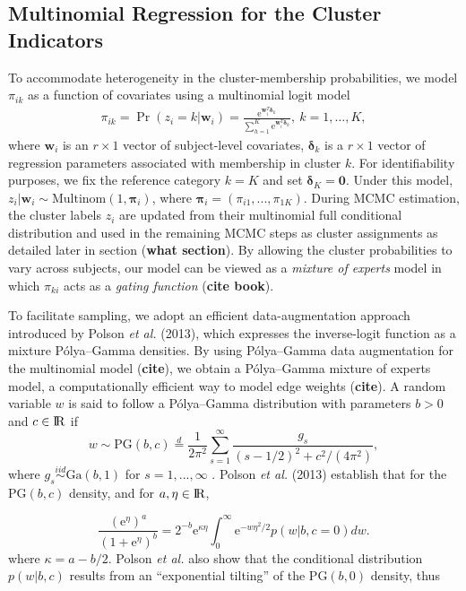\documentclass[useAMS,referee]{biom}
\begin{document}
\subsection{Multinomial Regression for the Cluster Indicators}
To accommodate heterogeneity in the cluster-membership probabilities, we model $\pi_{ik}$ as a function of covariates using a multinomial logit model 
\begin{eqnarray}
\pi_{ik} = \Pr(z_i = k|\mathbf{w}_i) = \frac{\text{e}^{\mathbf{w}_i^T \boldsymbol\delta_k}}{\sum_{h = 1}^K \text{e}^{\mathbf{w}_i^T \boldsymbol\delta_{h}}},~ k=1,\ldots,K,
\end{eqnarray}
where $\mathbf{w}_i$ is an $r\times 1$ vector of subject-level covariates, $\boldsymbol\delta_k$ is a $r\times 1$ vector of regression parameters associated with membership in cluster $k$. For identifiability purposes, we fix the reference category $k = K$ and set $\boldsymbol\delta_K = \mathbf{0}$. Under this model, $z_i|\mathbf{w}_i \sim \text{Multinom}(1,\boldsymbol\pi_i)$, where $\boldsymbol\pi_i = (\pi_{i1},...,\pi_{1K})$. During MCMC estimation, the cluster labels $z_i$ are updated from their multinomial full conditional distribution and used in the remaining MCMC steps as cluster assignments as detailed later in section (\textbf{what section}). By allowing the cluster probabilities to vary across subjects, our model can be viewed as a \textit{mixture of experts} model in which $\pi_{ki}$ acts as a \textit{gating function} (\textbf{cite book}). 

To facilitate sampling, we adopt an efficient data-augmentation approach introduced by Polson \textit{et al.} (2013), which expresses the inverse-logit function as a mixture P\'olya--Gamma densities. By using P\'olya--Gamma data augmentation for the multinomial model (\textbf{cite}), we obtain a P\'olya--Gamma mixture of experts model, a computationally efficient way to model edge weights (\textbf{cite}). A random variable ${w}$ is said to follow a P\'olya--Gamma distribution with parameters $b > 0$ and $c \in {\rm I\!R}$ if
\begin{equation}
{w} \sim \text{PG}(b,c) \stackrel{d}{=} \frac{1}{2\pi^2}\sum_{s=1}^{\infty}\frac{g_s}{(s-1/2)^2 + c^2/(4\pi^2)}, \label{eq:pg1}
\end{equation}
where $g_s \stackrel{iid}{\sim} \text{Ga}(b,1)$ for $s = 1,...,\infty$ . Polson \textit{et al.} (2013) establish that for the $\text{PG}(b,c)$ density, and for $a,\eta \in {\rm I\!R}$, 

\begin{equation}
\frac{(\text{e}^{\eta})^a}{(1 + \text{e}^{\eta})^b} = 2^{-b}\text{e}^{\kappa \eta} \int_{0}^{\infty} \text{e}^{-{w}\eta^2/2}p({w}|b,c = 0)d{w}. \label{eq:pg2}
\end{equation}
where $\kappa = a - b/2$. Polson \textit{et al.} also show that the conditional distribution $p(w|b,c)$ results from an ``exponential tilting'' of the $\text{PG}(b,0)$ density, thus
\end{document}
